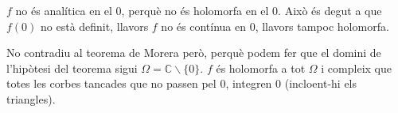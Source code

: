 \documentclass[10pt,a4paper]{article}
\begin{document}
\begin{enumerate}
\begin{framed}
$f$ no és analítica en el 0, perquè no és holomorfa en el 0. Això és degut a que $f(0)$ no està definit, llavors $f$ no és contínua en 0, llavors tampoc holomorfa.

No contradiu al teorema de Morera però, perquè podem fer que el domini de l'hipòtesi del teorema sigui $\Omega = \mathbb{C}\backslash\{0\}$. $f$ és holomorfa a tot $\Omega$ i compleix que totes les corbes tancades que no passen pel 0, integren 0 (incloent-hi els triangles).

\end{framed}	 
		
\end{enumerate}
\end{document}
